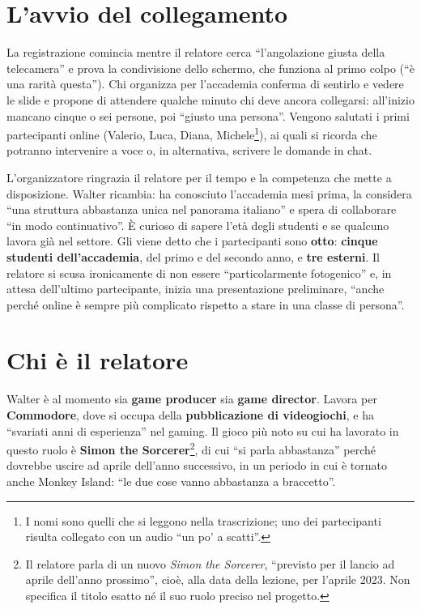 \section{L'avvio del collegamento}
\label{sec:z5-avvio}

La registrazione comincia mentre il relatore cerca ``l'angolazione giusta della
telecamera'' e prova la condivisione dello schermo, che funziona al primo colpo
(``è una rarità questa''). Chi organizza per l'accademia conferma di sentirlo e
vedere le slide e propone di attendere qualche minuto chi deve ancora
collegarsi: all'inizio mancano cinque o sei persone, poi ``giusto una persona''.
Vengono salutati i primi partecipanti online (Valerio, Luca, Diana,
Michele\footnote{I nomi sono quelli che si leggono nella trascrizione; uno dei
partecipanti risulta collegato con un audio ``un po' a scatti''.}), ai quali si
ricorda che potranno intervenire a voce o, in alternativa, scrivere le domande
in chat.

L'organizzatore ringrazia il relatore per il tempo e la competenza che mette a
disposizione. Walter ricambia: ha conosciuto l'accademia mesi prima, la
considera ``una struttura abbastanza unica nel panorama italiano'' e spera di
collaborare ``in modo continuativo''. È curioso di sapere l'età degli studenti
e se qualcuno lavora già nel settore. Gli viene detto che i partecipanti sono
\textbf{otto}: \textbf{cinque studenti dell'accademia}, del primo e del secondo
anno, e \textbf{tre esterni}. Il relatore si scusa ironicamente di non essere
``particolarmente fotogenico'' e, in attesa dell'ultimo partecipante, inizia una
presentazione preliminare, ``anche perché online è sempre più complicato
rispetto a stare in una classe di persona''.

\section{Chi è il relatore}
\label{sec:z5-relatore}

Walter è al momento sia \textbf{game producer} sia \textbf{game director}.
Lavora per \textbf{Commodore}, dove si occupa della \textbf{pubblicazione di
videogiochi}, e ha ``svariati anni di esperienza'' nel gaming. Il gioco più
noto su cui ha lavorato in questo ruolo è \textbf{Simon the
Sorcerer}\footnote{Il relatore parla di un nuovo \emph{Simon the Sorcerer},
``previsto per il lancio ad aprile dell'anno prossimo'', cioè, alla data della
lezione, per l'aprile 2023. Non specifica il titolo esatto né il suo ruolo
preciso nel progetto.}, di cui ``si parla abbastanza'' perché dovrebbe uscire
ad aprile dell'anno successivo, in un periodo in cui è tornato anche Monkey
Island: ``le due cose vanno abbastanza a braccetto''.

